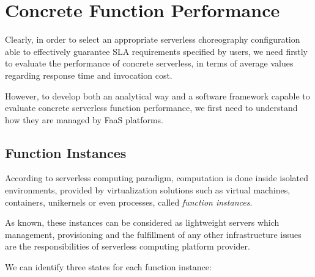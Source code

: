\documentclass[12pt,a4paper]{report}
\begin{document}
\section{Concrete Function Performance}

Clearly, in order to select an appropriate serverless choreography configuration able to effectively guarantee SLA requirements specified by users, we need firstly to evaluate the performance of concrete serverless, in terms of average values regarding response time and invocation cost.

However, to develop both an analytical way and a software framework capable to evaluate concrete serverless function performance, we first need to understand
how they are managed by FaaS platforms.

\subsection{Function Instances}

According to serverless computing paradigm, computation is done inside isolated environments, provided by virtualization solutions such as virtual machines, containers, unikernels or even processes, called \textit{function instances}.

As known, these instances can be considered as lightweight servers which management, provisioning and the fulfillment of any other infrastructure issues are the responsibilities of serverless computing platform provider.

We can identify three states for each function instance:
\end{document}
